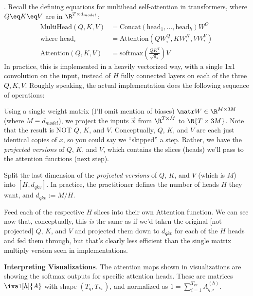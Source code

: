\documentclass[11pt]{article}
\begin{document}

. Recall the defining equations for multihead self-attention in transformers, where $Q \eq K \eq V$ are in $\R^{T \times d_{model}}$:
\begin{align}
	\text{MultiHead}(Q, K, V)
	&= \text{Concat}(\text{head}_1, \ldots, \text{head}_h) W^O \\
	\text{where head}_i &= \text{Attention}(QW_i^Q, KW_i^K, VW_i^V) \\
	\text{Attention}(Q, K, V) 
	&= \text{softmax}\left( 
	\frac{QK^T}{\sqrt{d_k}}
	\right) V
\end{align}
In practice, this is implemented in a heavily vectorized way, with a single 1x1 convolution on the input, instead of $H$ fully connected layers on each of the three $Q, K, V$. Roughly speaking, the actual implementation does the following sequence of operations:
\begin{compactenum}
	\item Using a single weight matrix (I'll omit mention of biases) $\matr W \in \R^{M \times 3M }$ (where $M \equiv d_{model}$), we project the inputs $\vec x$ from $\R^{T \times M}$ to $\R{T \times 3M}$. Note that the result is NOT $Q$, $K$, and $V$. Conceptually, $Q$, $K$, and $V$ are each just identical copies of $x$, so you could say we ``skipped'' a step. Rather, we have the \textit{projected versions} of $Q$, $K$, and $V$, which contains the slices (heads) we'll pass to the attention functions (next step). 
	
	\item Split the last dimension of the \textit{projected versions }of $Q$, $K$, and $V$ (which is $M$) into $[H, d_{qkv}]$. In practice, the practitioner defines the number of heads $H$ they want, and $d_{qkv} := M / H$.  
	
	\item Feed each of the respective $H$ slices into their own Attention function. We can see now that, conceptually, this \textit{is} the same as if we'd taken the original [not projected] $Q$, $K$, and $V$ and projected them down to $d_{qkv}$ for each of the $H$ heads and fed them through, but that's clearly less efficient than the single matrix multiply version seen in implementations.
\end{compactenum} 
\textbf{Interpreting Visualizations}. The attention maps shown in visualizations are showing the softmax outputs for specific attention heads. These are matrices $\ival[h]{A}$ with shape $(T_q, T_{kv})$, and normalized as $1 = \sum_{i=1}^{T_{kv}} A^{(h)}_{q, i}$. 
\end{document}
